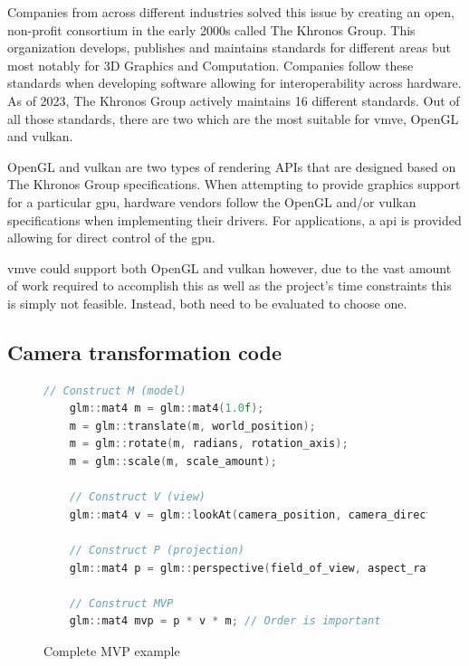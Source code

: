 \documentclass[11pt]{article}
\begin{document}
Companies from across different industries solved this issue by creating
an open, non-profit consortium in the early 2000s called The Khronos Group. This
organization develops, publishes and maintains standards for different areas
but most notably for 3D Graphics and Computation. Companies follow these 
standards when developing software allowing for interoperability across
hardware. As of 2023, The Khronos Group actively maintains 16 different
standards. Out of all those standards, there are two which are the most
suitable for \gls*{vmve}, OpenGL and \gls*{vulkan}.

OpenGL and \gls*{vulkan} are two types of rendering APIs that are designed based on
The Khronos Group specifications. When attempting to provide graphics support
for a particular \gls*{gpu}, hardware vendors follow the OpenGL and/or \gls*{vulkan}
specifications when implementing their drivers. For applications, a
\gls*{api} is provided allowing for direct control of the \gls*{gpu}.

\gls*{vmve} could support both OpenGL and \gls*{vulkan} however, due to the vast
amount of work required to accomplish this as well as the project's time
constraints this is simply not feasible. Instead, both need to be evaluated to
choose one.


\subsection{Camera transformation code}
\begin{figure}[H]
  \centering
  \begin{lstlisting}[language=C++]
    // Construct M (model)
    glm::mat4 m = glm::mat4(1.0f);
    m = glm::translate(m, world_position);   
    m = glm::rotate(m, radians, rotation_axis); 
    m = glm::scale(m, scale_amount);

    // Construct V (view)
    glm::mat4 v = glm::lookAt(camera_position, camera_direction, camera_up);

    // Construct P (projection)
    glm::mat4 p = glm::perspective(field_of_view, aspect_ratio, near, far);

    // Construct MVP
    glm::mat4 mvp = p * v * m; // Order is important

  \end{lstlisting}
  \caption{Complete MVP example}
  \label{fig:local_to_world_appendix}
\end{figure}
\end{document}
